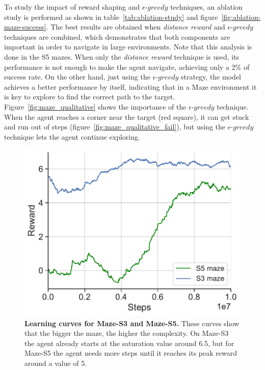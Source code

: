To study the impact of reward shaping and $\epsilon\text{-}greedy$ techniques, an ablation study is performed as shown in table~\ref{tab:ablation-study} and figure~\ref{fig:ablation-maze-success}.
The best results are obtained when \textit{distance reward} and $\epsilon\text{-}greedy$ techniques are combined, which demonstrates that both components are important in order to navigate in large environments.
Note that this analysis is done in the S5 mazes.
When only the \textit{distance reward} technique is used, its performance is not enough to make the agent navigate, achieving only a 2\% of success rate.
On the other hand, just using the $\epsilon\text{-}greedy$ strategy, the model achieves a better performance by itself, indicating that in a Maze environment it is key to explore to find the correct path to the target.
Figure~\ref{fig:maze_qualitative} shows the importance of the $\epsilon\text{-}greedy$ technique.
When the agent reaches a corner near the target (red square), it can get stuck and run out of steps (figure~\ref{fig:maze_qualitative_fail}), but using the $\epsilon\text{-}greedy$ technique lets the agent continue exploring.

\begin{figure}
    \centering
    \includegraphics[width=0.8\linewidth]{figures/understanding_vsn/S3_S5_reward}
    \caption[Learning curves for Maze-S3 and Maze-S5]{\textbf{Learning curves for Maze-S3 and Maze-S5.} These curves show that the bigger the maze, the higher the complexity. On Maze-S3 the agent already starts at the saturation value around 6.5, but for Maze-S5 the agent needs more steps until it reaches its peak reward around a value of 5.}
    \label{fig:reward-maze-results}
\end{figure}

